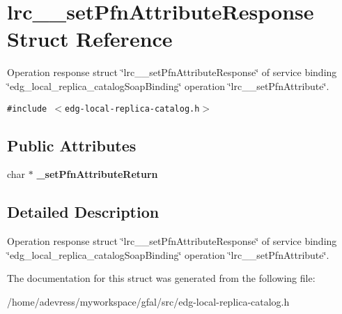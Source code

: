 \section{lrc\_\-\_\-set\-Pfn\-Attribute\-Response Struct Reference}
\label{structlrc____setPfnAttributeResponse}
Operation response struct \char`\"{}lrc\_\-\_\-set\-Pfn\-Attribute\-Response\char`\"{} of service binding \char`\"{}edg\_\-local\_\-replica\_\-catalog\-Soap\-Binding\char`\"{} operation \char`\"{}lrc\_\-\_\-set\-Pfn\-Attribute\char`\"{}.  


{\tt \#include $<$edg-local-replica-catalog.h$>$}

\subsection*{Public Attributes}
\begin{CompactItemize}
\item 
char $\ast$ \textbf{\_\-set\-Pfn\-Attribute\-Return}\label{structlrc____setPfnAttributeResponse_b04f406205c9ca378490ff5553381c20}

\end{CompactItemize}


\subsection{Detailed Description}
Operation response struct \char`\"{}lrc\_\-\_\-set\-Pfn\-Attribute\-Response\char`\"{} of service binding \char`\"{}edg\_\-local\_\-replica\_\-catalog\-Soap\-Binding\char`\"{} operation \char`\"{}lrc\_\-\_\-set\-Pfn\-Attribute\char`\"{}. 



The documentation for this struct was generated from the following file:\begin{CompactItemize}
\item 
/home/adevress/myworkspace/gfal/src/edg-local-replica-catalog.h\end{CompactItemize}
